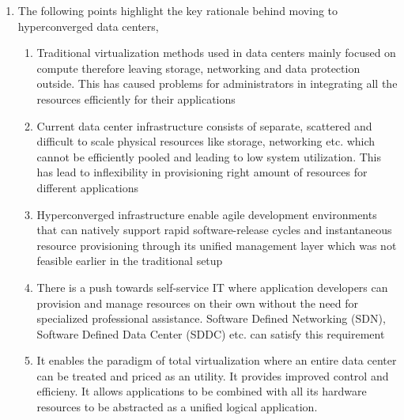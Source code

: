 \documentclass[11pt,a4paper,oneside]{article}
\begin{document}
\begin{enumerate}
                	
         
         \item	The following points highlight the key rationale behind moving to hyperconverged data centers,
                \begin{enumerate}
                	\item Traditional virtualization methods used in data centers mainly focused on compute therefore leaving storage, networking and data protection outside. This has caused problems for administrators in integrating all the resources efficiently for their applications
                	\item Current data center infrastructure consists of separate, scattered and difficult to scale physical resources like storage, networking etc. which cannot be efficiently pooled and leading to low system utilization. This has lead to inflexibility in provisioning right amount of resources for different applications
                	\item Hyperconverged infrastructure enable agile development environments that can natively support rapid software-release cycles and instantaneous resource provisioning through its unified management layer which was not feasible earlier in the traditional setup
                	\item There is a push towards self-service IT where application developers can provision and manage resources on their own without the need for specialized professional assistance. Software Defined Networking (SDN), Software Defined Data Center (SDDC) etc. can satisfy this requirement
                	\item It enables the paradigm of total virtualization where an entire data center can be treated and priced as an utility. It provides improved control and efficieny. It allows applications to be combined with all its hardware resources to be abstracted as a unified logical application.
                \end{enumerate}
		 			
				
	\end{enumerate}
    
\end{document}
